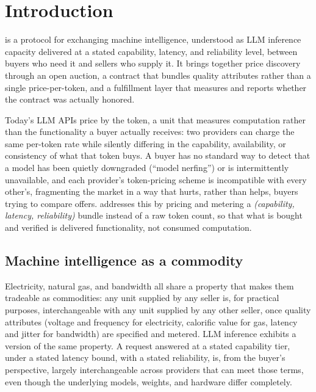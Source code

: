 \maketitle

\setcounter{tocdepth}{2}
\tableofcontents

\section{Introduction}
\label{sec:introduction}

\Noesis{} is a protocol for exchanging machine intelligence, understood as LLM
inference capacity delivered at a stated capability, latency, and reliability
level, between buyers who need it and sellers who supply it. It brings together
price discovery through an open auction, a contract that bundles quality
attributes rather than a single price-per-token, and a fulfillment layer that
measures and reports whether the contract was actually honored.

Today's LLM APIs price by the token, a unit that measures computation rather
than the functionality a buyer actually receives: two providers can charge
the same per-token rate while silently differing in the capability,
availability, or consistency of what that token buys. A buyer has no
standard way to detect that a model has been quietly downgraded (``model
nerfing'') or is intermittently unavailable, and each provider's
token-pricing scheme is incompatible with every other's, fragmenting the
market in a way that hurts, rather than helps, buyers trying to compare
offers. \Noesis{} addresses this by pricing and metering a \emph{(capability,
latency, reliability)} bundle instead of a raw token count, so that what is
bought and verified is delivered functionality, not consumed computation.

\subsection{Machine intelligence as a commodity}
\label{sec:intelligence_as_commodity}

Electricity, natural gas, and bandwidth all share a property that makes them
tradeable as commodities: any unit supplied by any seller is, for practical
purposes, interchangeable with any unit supplied by any other seller, once
quality attributes (voltage and frequency for electricity, calorific value for
gas, latency and jitter for bandwidth) are specified and metered. LLM inference
exhibits a version of the same property. A request answered at a stated
capability tier, under a stated latency bound, with a stated reliability, is,
from the buyer's perspective, largely interchangeable across providers that can
meet those terms, even though the underlying models, weights, and hardware
differ completely.

